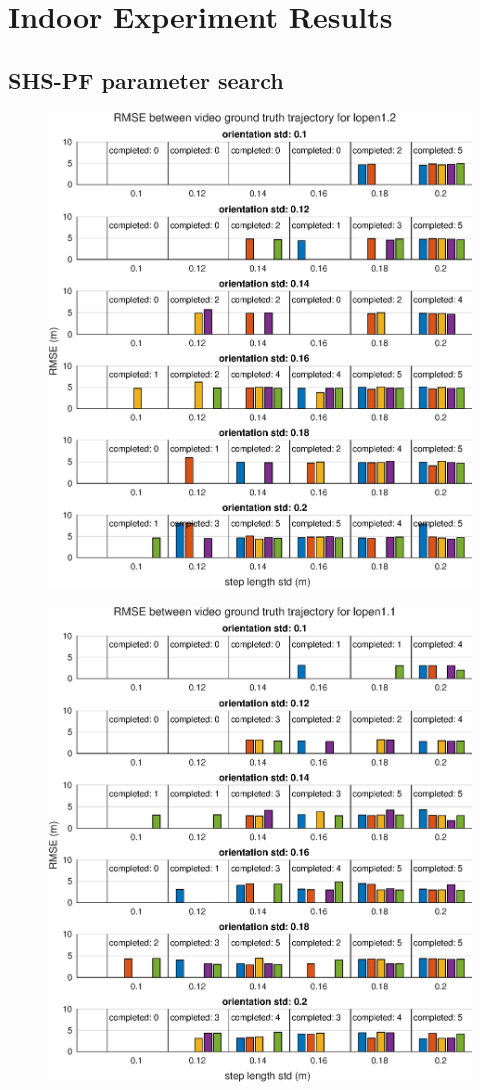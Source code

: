 \chapter{Indoor Experiment Results}

\section{SHS-PF parameter search}
\begin{figure}[H]
	\centering
	\includegraphics[width=0.7\linewidth]{images/20201107_1312_orientation_std_0_2}
	\caption{}
	\label{fig:202011071312orientationstd02}
\end{figure}
\begin{figure}[H]
	\centering
	\includegraphics[width=0.7\linewidth]{images/20201107_1311_orientation_std_0_2}
	\caption{}
	\label{fig:202011071311orientationstd02}
\end{figure}

